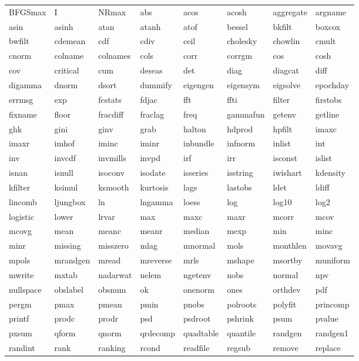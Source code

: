 \begin{tabular}{llllllll}
BFGSmax & I & NRmax & abs & acos & acosh & aggregate & argname \\
asin & asinh & atan & atanh & atof & bessel & bkfilt & boxcox \\
bwfilt & cdemean & cdf & cdiv & ceil & cholesky & chowlin & cmult \\
cnorm & colname & colnames & cols & corr & corrgm & cos & cosh \\
cov & critical & cum & deseas & det & diag & diagcat & diff \\
digamma & dnorm & dsort & dummify & eigengen & eigensym & eigsolve & epochday \\
errmsg & exp & fcstats & fdjac & fft & ffti & filter & firstobs \\
fixname & floor & fracdiff & fraclag & freq & gammafun & getenv & getline \\
ghk & gini & ginv & grab & halton & hdprod & hpfilt & imaxc \\
imaxr & imhof & iminc & iminr & inbundle & infnorm & inlist & int \\
inv & invcdf & invmills & invpd & irf & irr & isconst & islist \\
isnan & isnull & isoconv & isodate & isseries & isstring & iwishart & kdensity \\
kfilter & ksimul & ksmooth & kurtosis & lags & lastobs & ldet & ldiff \\
lincomb & ljungbox & ln & lngamma & loess & log & log10 & log2 \\
logistic & lower & lrvar & max & maxc & maxr & mcorr & mcov \\
mcovg & mean & meanc & meanr & median & mexp & min & minc \\
minr & missing & misszero & mlag & mnormal & mols & monthlen & movavg \\
mpols & mrandgen & mread & mreverse & mrls & mshape & msortby & muniform \\
mwrite & mxtab & nadarwat & nelem & ngetenv & nobs & normal & npv \\
nullspace & obslabel & obsnum & ok & onenorm & ones & orthdev & pdf \\
pergm & pmax & pmean & pmin & pnobs & polroots & polyfit & princomp \\
printf & prodc & prodr & psd & psdroot & pshrink & psum & pvalue \\
pxsum & qform & qnorm & qrdecomp & quadtable & quantile & randgen & randgen1 \\
randint & rank & ranking & rcond & readfile & regsub & remove & replace \\

\end{tabular}
